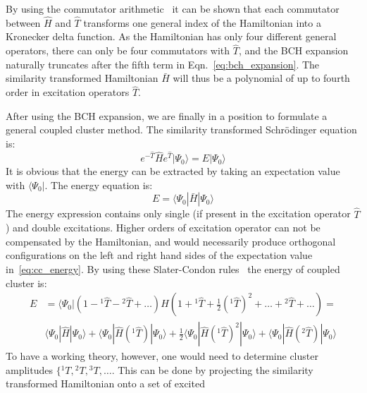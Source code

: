 By using the commutator arithmetic~\cite{shavitt2009many} it can be shown that 
each commutator between $\hat{H}$ and $\hat{T}$ transforms one general index 
of the Hamiltonian into a Kronecker delta function. As the Hamiltonian has only 
four different general operators, there can only be four commutators with 
$\hat{T}$, and the BCH expansion naturally truncates after the fifth term in 
Eqn.~\ref{eq:bch_expansion}. The similarity transformed Hamiltonian $\bar{H}$ 
will thus be a polynomial of up to fourth order in excitation operators 
$\hat{T}$.

After using the BCH expansion, we are finally in a position to formulate a 
general coupled cluster method. The similarity transformed Schr{\"o}dinger 
equation is:
%
\begin{equation}
 e^{-\hat{T}} \hat{H} e^{\hat{T}} |\Psi_{0}\rangle = E |\Psi_{0}\rangle
 \label{eq:sim_cc_schroedinger}
\end{equation}
It is obvious that the energy can be extracted by taking an expectation value 
with $\langle \Psi_{0}|$. The energy equation is:
%
\begin{equation}
 E = \langle \Psi_{0} | \bar{H} | \Psi_{0} \rangle
 \label{eq:cc_energy}
\end{equation}
The energy expression contains only single (if present in the excitation 
operator $\hat{T}$) and double excitations. Higher orders of 
excitation operator can not be compensated by the Hamiltonian, and would 
necessarily produce orthogonal configurations on the left and right hand sides 
of the expectation value in~\ref{eq:cc_energy}. By using these Slater-Condon 
rules~\cite{jensen2017introduction} the energy of coupled cluster is:
%
\begin{equation}
\begin{aligned}
 E &= \langle \Psi_{0} | (1 - {}^{1}\hat{T} - {}^{2}\hat{T} + \ldots) H (1 + 
{}^{1}\hat{T} + \frac{1}{2} ({}^{1}\hat{T})^2 + \ldots + {}^2 \hat{T} + \ldots) 
= \\
& \langle \Psi_{0} | \hat{H} | \Psi_{0} \rangle + \langle \Psi_{0} | \hat{H} 
({}^{1}\hat{T})| 
\Psi_{0} \rangle + \frac{1}{2} \langle \Psi_{0} | \hat{H} ({}^{1}\hat{T})^2 | 
\Psi_{0} 
\rangle + \langle \Psi_{0} | \hat{H} ({}^{2} \hat{T})| \Psi_{0} \rangle
\end{aligned}
\end{equation}
%
To have a working theory, however, one would need to 
determine cluster amplitudes $\{{}^{1}T, {}^{2}T, {}^{3}T, \ldots$. This can be 
done by projecting the similarity transformed Hamiltonian onto a set of excited 
